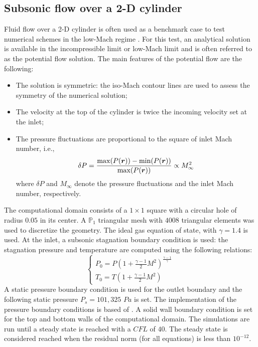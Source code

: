 \subsection{Subsonic flow over a 2-D cylinder} \label{sec:cylinder}
Fluid flow over a 2-D cylinder is often used as a benchmark case to test numerical schemes in the low-Mach regime \cite{LowMach1, LowMach2, LowMach3}. For this test, an analytical solution is available in the incompressible limit or low-Mach limit and is often referred to as the potential flow solution. The main features of the potential flow are the following:
%
\begin{itemize}
\item The solution is symmetric: the iso-Mach contour lines are used to assess the symmetry of the numerical solution;
\item The velocity at the top of the cylinder is twice the incoming velocity set at the inlet;
\item The pressure fluctuations are proportional to the square of inlet Mach number, i.e., 
\begin{equation}
\delta P = \frac{\max(P(\boldsymbol r)) - \min(P(\boldsymbol r))}{\max(P(\boldsymbol r))}  \propto M_\infty^2
\end{equation}
where $\delta P$ and $M_\infty$ denote the pressure fluctuations and the inlet Mach number, respectively.
\end{itemize}
%
The computational domain consists of a $1\times 1$ square with a circular hole of radius $0.05$ in its center. A $\mathbb{P}_1$ triangular mesh with $4008$ triangular elements was used to discretize the geometry. The ideal gas equation of state, with $\gamma=1.4$ is used. At the inlet, a subsonic stagnation boundary condition is used: the stagnation pressure and temperature are computed using the following relations:
%
\begin{equation}
\label{eq:stagnation_relations}
\left\{
\begin{array}{l}
P_0 = P\left( 1 + \frac{\gamma-1}{2} M^2 \right)^{\frac{\gamma-1}{\gamma}} \\
T_0 = T\left( 1 + \frac{\gamma-1}{2} M^2 \right)
\end{array}
\right.
\end{equation}
%
A static pressure boundary condition is used for the outlet boundary and the following static pressure $P_s = 101,325$ $Pa$ is set. The implementation of the pressure boundary conditions is based of \cite{SEM}. A solid wall boundary condition is set for the top and bottom walls of the computational domain. The simulations are run until a steady state is reached with a $CFL$ of $40$. The steady state is considered reached when the residual norm  (for all equations) is less than $10^{-12}$.

